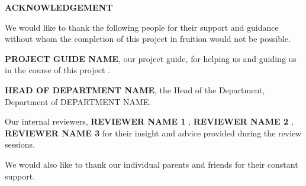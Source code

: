 \thispagestyle{plain}
\begin{center}
\textbf{ACKNOWLEDGEMENT}
\end{center}

\vspace{0.3cm}
\noindent
\fontsize{12pt}{24pt}\selectfont We would like to thank the following people for their support and guidance without whom the completion of this project in fruition would not be possible.

\vspace{2.0cm}
\noindent
\fontsize{12pt}{24pt}\selectfont \textbf{PROJECT GUIDE NAME}, our project guide, for helping us and guiding us in the course of this project .\\

\vspace{1.0cm}

\noindent
\fontsize{12pt}{24pt}\selectfont \textbf{HEAD OF DEPARTMENT NAME}, the Head of the Department, Department of DEPARTMENT NAME.\\

\vspace{1.0cm}

\noindent
\fontsize{12pt}{24pt}\selectfont Our internal reviewers, \textbf{REVIEWER NAME 1} , \textbf{REVIEWER NAME 2} , \textbf{REVIEWER NAME 3} for their insight and advice provided during the review sessions. \\

\vspace{1.0cm}

\noindent
\fontsize{12pt}{24pt}\selectfont We would also like to thank our individual parents and friends for their constant support.\\

\newpage